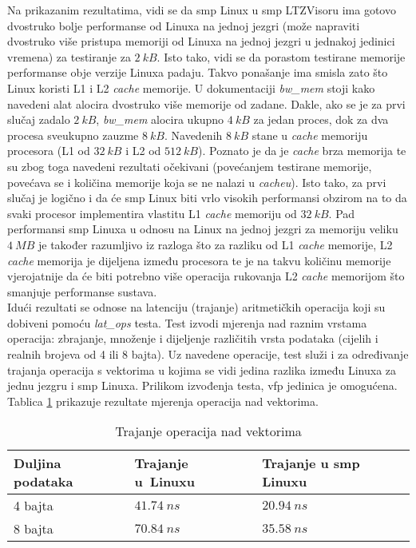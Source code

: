 \documentclass[times, utf8, diplomski, numeric]{fer}
\begin{document}
Na prikazanim rezultatima, vidi se da \gls{smp} Linux u \gls{smp} LTZVisoru ima gotovo dvostruko bolje performanse od Linuxa na
jednoj jezgri (može napraviti dvostruko više pristupa memoriji od Linuxa na jednoj jezgri u jednakoj jedinici vremena)
za testiranje za $2~kB$.
Isto tako, vidi se da porastom testirane memorije performanse obje verzije Linuxa padaju. Takvo ponašanje ima smisla zato
što Linux koristi L1 i L2 \textit{cache} memorije. U dokumentaciji \textit{bw\_mem} stoji kako navedeni alat alocira
dvostruko više memorije od zadane. Dakle, ako se je za prvi slučaj zadalo $2~kB$, \textit{bw\_mem} alocira ukupno $4~kB$
za jedan proces, dok za dva procesa sveukupno zauzme $8~kB$. Navedenih $8~kB$ stane u \textit{cache} memoriju procesora
(L1 od $32~kB$ i L2 od $512~kB$). Poznato je da je \textit{cache} brza memorija te su zbog toga navedeni rezultati
očekivani (povećanjem testirane memorije, povećava se i količina memorije koja se ne nalazi u \textit{cacheu}). Isto tako,
za prvi slučaj je logično i da će \gls{smp} Linux biti vrlo visokih performansi obzirom na to da svaki procesor implementira
vlastitu L1 \textit{cache} memoriju od $32~kB$. Pad performansi \gls{smp} Linuxa u odnosu na Linux na jednoj jezgri za memoriju
veliku $4~MB$ je također razumljivo iz razloga što za razliku od L1 \textit{cache} memorije, L2 \textit{cache} memorija
je dijeljena između procesora te je na takvu količinu memorije vjerojatnije da će biti potrebno više operacija rukovanja
L2 \textit{cache} memorijom što smanjuje performanse sustava.\\
Idući rezultati se odnose na latenciju (trajanje) aritmetičkih operacija koji su dobiveni pomoću \textit{lat\_ops}
testa. Test izvodi mjerenja nad raznim vrstama operacija: zbrajanje, množenje i dijeljenje različitih vrsta podataka
(cijelih i realnih brojeva od 4 ili 8 bajta). Uz navedene operacije, test služi i za određivanje trajanja operacija
s vektorima u kojima se vidi jedina razlika između Linuxa za jednu jezgru i \gls{smp} Linuxa. Prilikom izvođenja testa,
\gls{vfp} jedinica je omogućena. Tablica \ref{vect_ops} prikazuje rezultate mjerenja operacija nad vektorima.

\begin{table}[H]
  \centering
  \caption{Trajanje operacija nad vektorima}
  \label{vect_ops}
  \begin{tabular}{|| p{4cm} | p{3.5cm} | p{3.5cm} ||}
    \hline
    \textbf{Duljina podataka} & \textbf{Trajanje u~Linuxu} & \textbf{Trajanje u \gls{smp} Linuxu} \\
    \hline\hline
    4 bajta & $41.74~ns$ & $20.94~ns$\\
    \hline
    8 bajta & $70.84~ns$ & $35.58~ns$\\
    \hline
  \end{tabular}
\end{table}
\end{document}
